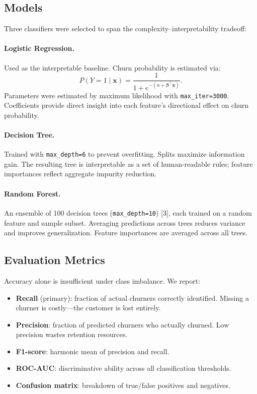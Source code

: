 \documentclass{article}
\begin{document}
\subsection{Models}

Three classifiers were selected to span the complexity--interpretability
tradeoff:

\paragraph{Logistic Regression.}
Used as the interpretable baseline. Churn probability is estimated via:
\[
  P(Y=1 \mid \mathbf{x})
  = \frac{1}{1 + e^{-(\alpha + \boldsymbol{\beta}^\top \mathbf{x})}}.
\]
Parameters were estimated by maximum likelihood with \texttt{max\_iter=3000}.
Coefficients provide direct insight into each feature's directional effect on
churn probability.

\paragraph{Decision Tree.}
Trained with \texttt{max\_depth=6} to prevent overfitting. Splits maximize
information gain. The resulting tree is interpretable as a set of
human-readable rules; feature importances reflect aggregate impurity
reduction.

\paragraph{Random Forest.}
An ensemble of 100 decision trees (\texttt{max\_depth=10}) [3], each trained
on a random feature and sample subset. Averaging predictions across trees
reduces variance and improves generalization. Feature importances are averaged
across all trees.

\subsection{Evaluation Metrics}

Accuracy alone is insufficient under class imbalance. We report:
\begin{itemize}
  \item \textbf{Recall} (primary): fraction of actual churners correctly
        identified. Missing a churner is costly---the customer is lost
        entirely.
  \item \textbf{Precision}: fraction of predicted churners who actually
        churned. Low precision wastes retention resources.
  \item \textbf{F1-score}: harmonic mean of precision and recall.
  \item \textbf{ROC-AUC}: discriminative ability across all classification
        thresholds.
  \item \textbf{Confusion matrix}: breakdown of true/false positives and
        negatives.
\end{itemize}
\end{document}
